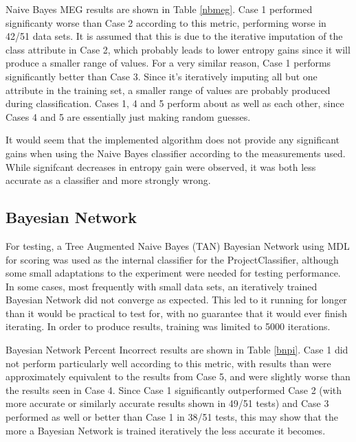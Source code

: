Naive Bayes MEG results are shown in Table \ref{nbmeg}. Case 1 performed significanty worse than Case 2 according to this metric, performing worse in 42/51 data sets. It is assumed that this is due to the iterative imputation of the class attribute in Case 2, which probably leads to lower entropy gains since it will produce a smaller range of values. For a very similar reason, Case 1 performs significantly better than Case 3. Since it's iteratively imputing all but one attribute in the training set, a smaller range of values are probably produced during classification. Cases 1, 4 and 5 perform about as well as each other, since Cases 4 and 5 are essentially just making random guesses.

It would seem that the implemented algorithm does not provide any significant gains when using the Naive Bayes classifier according to the measurements used. While signifcant decreases in entropy gain were observed, it was both less accurate as a classifier and more strongly wrong.





\FloatBarrier

\subsection{Bayesian Network}
For testing, a Tree Augmented Naive Bayes (TAN) Bayesian Network using MDL for scoring was used as the internal classifier for the ProjectClassifier, although some small adaptations to the experiment were needed for testing performance. In some cases, most frequently with small data sets, an iteratively trained Bayesian Network did not converge as expected. This led to it running for longer than it would be practical to test for, with no guarantee that it would ever finish iterating. In order to produce results, training was limited to 5000 iterations.

Bayesian Network Percent Incorrect results are shown in Table \ref{bnpi}. Case 1 did not perform particularly well according to this metric, with results than were approximately equivalent to the results from Case 5, and were slightly worse than the results seen in Case 4. Since Case 1 significantly outperformed Case 2 (with more accurate or similarly accurate results shown in 49/51 tests) and Case 3 performed as well or better than Case 1 in 38/51 tests, this may show that the more a Bayesian Network is trained iteratively the less accurate it becomes. 

